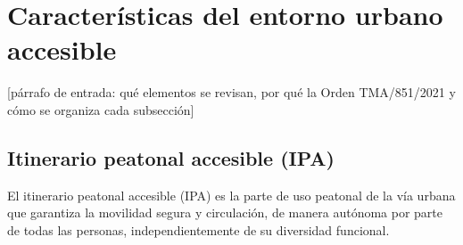 \providecommand{\porrellenar}[1][por rellenar]{{\sffamily\footnotesize\color{tinta-suave}[#1]}}

\newenvironment{tablarequisitos}[2]{%
  \begin{table}[htbp]\centering\small
  \caption{#1}\label{#2}%
  \begin{tabular}{>{\raggedright\arraybackslash}p{\dimexpr0.24\linewidth-2\tabcolsep\relax}
                  >{\raggedright\arraybackslash}p{\dimexpr0.62\linewidth-2\tabcolsep\relax}
                  >{\raggedright\arraybackslash}p{\dimexpr0.14\linewidth-2\tabcolsep\relax}}
  \toprule
  \cabeceratabla \textbf{Parámetro} & \textbf{Requisito} & \textbf{Artículo} \\
  \midrule}
 {\bottomrule
  \end{tabular}
  \fuente{Orden TMA/851/2021.}%
  \end{table}}

\newcommand{\datosplanes}[2]{%
  \begin{recuadro}[nota]{Cómo aparece en los datos}
    \textbf{Albacete.} #1\par\smallskip
    \textbf{Algeciras.} #2
  \end{recuadro}}

\newcommand{\parametroclave}[1]{\aclaracion[Parámetro determinante]{#1}}


\section{Características del entorno urbano accesible}
\label{sec:caracteristicas}
\porrellenar[párrafo de entrada: qué elementos se revisan, por qué la Orden
TMA/851/2021 y cómo se organiza cada subsección]

\subsection{Itinerario peatonal accesible (IPA)}
\label{subsec:ipa}

El itinerario peatonal accesible (IPA) es la parte de uso peatonal de la vía urbana que garantiza la movilidad segura y circulación, de manera autónoma por parte de todas las personas, independientemente de su diversidad funcional.
\\

